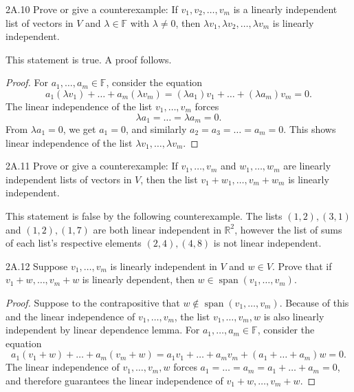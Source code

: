 \documentclass{exam}
\DeclareMathOperator{\spn}{span}
\begin{document}
\begin{problem}{2A.10}
    Prove or give a counterexample: If $v_1, v_2,\dots,v_m$ is a linearly independent list of vectors in $V$ and $\lambda\in\mathbb F$ with $\lambda\neq 0$, then $\lambda v_1, \lambda v_2, \dots, \lambda v_m$ is linearly independent.
\end{problem}
This statement is true. A proof follows.
\begin{proof}
    For $a_1,\dots,a_m\in\mathbb F$, consider the equation \[
        a_1(\lambda v_1) + \dots + a_m(\lambda v_m)= (\lambda a_1)v_1 + \dots + (\lambda a_m)v_m = 0.
    \]
    The linear independence of the list $v_1, \dots, v_m$ forces \[
        \lambda a_1 = \dots = \lambda a_m = 0.
    \]
    From $\lambda a_1 = 0$, we get $a_1 = 0$, and similarly $a_2 = a_3 = \dots = a_m = 0$. This shows linear independence of the list $\lambda v_1, \dots, \lambda v_m$.
\end{proof}

\begin{problem}{2A.11}
    Prove or give a counterexample: If $v_1, \dots, v_m$ and $w_1, \dots, w_m$ are linearly independent lists of vectors in $V$, then the list $v_1 + w_1, \dots, v_m + w_m$ is linearly independent.
\end{problem}
This statement is false by the following counterexample. The lists $(1, 2), (3, 1)$ and $(1, 2), (1, 7)$ are both linear independent in $\mathbb R^2$, however the list of sums of each list's respective elements $(2, 4), (4, 8)$ is not linear independent.

\begin{problem}{2A.12}
    Suppose $v_1, \dots, v_m$ is linearly independent in $V$ and $w\in V$. Prove that if $v_1 + w, \dots, v_m + w$ is linearly dependent, then $w\in\spn(v_1, \dots, v_m)$.
\end{problem}

\begin{proof}
    Suppose to the contrapositive that $w\notin\spn(v_1, \dots, v_m)$. Because of this and the linear independence of $v_1,\dots, v_m$, the list $v_1, \dots, v_m, w$ is also linearly independent by linear dependence lemma. For $a_1, \dots, a_m\in\mathbb F$, consider the equation \[
        a_1(v_1 + w) + \dots + a_m(v_m + w) = a_1v_1 + \dots + a_mv_m + (a_1 + \dots + a_m)w = 0.
    \]
    The linear independence of $v_1, \dots, v_m, w$ forces $a_1 = \dots = a_m = a_1 + \dots + a_m = 0$, and therefore guarantees the linear independence of $v_1 + w, \dots, v_m + w$.
\end{proof}
\end{document}
